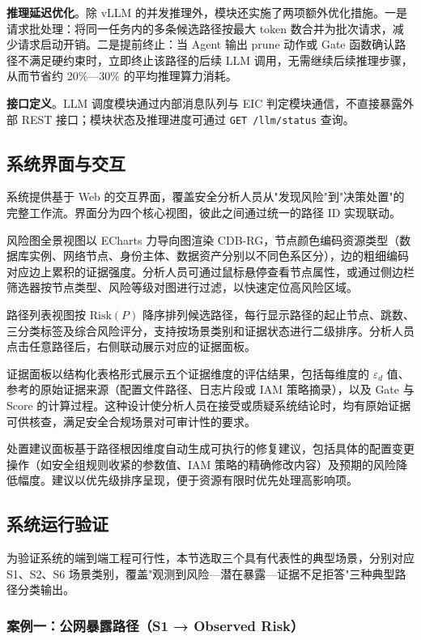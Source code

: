\documentclass[a4paper,12pt]{ctexart}
\begin{document}
\textbf{推理延迟优化}。除 vLLM 的并发推理外，模块还实施了两项额外优化措施。一是请求批处理：将同一任务内的多条候选路径按最大 token 数合并为批次请求，减少请求启动开销。二是提前终止：当 Agent 输出 prune 动作或 Gate 函数确认路径不满足硬约束时，立即终止该路径的后续 LLM 调用，无需继续后续推理步骤，从而节省约 20\%—30\% 的平均推理算力消耗。

\textbf{接口定义}。LLM 调度模块通过内部消息队列与 EIC 判定模块通信，不直接暴露外部 REST 接口；模块状态及推理进度可通过 \texttt{GET /llm/status} 查询。

\subsection{系统界面与交互}

系统提供基于 Web 的交互界面，覆盖安全分析人员从"发现风险"到"决策处置"的完整工作流。界面分为四个核心视图，彼此之间通过统一的路径 ID 实现联动。

风险图全景视图以 ECharts 力导向图渲染 CDB-RG，节点颜色编码资源类型（数据库实例、网络节点、身份主体、数据资产分别以不同色系区分），边的粗细编码对应边上累积的证据强度。分析人员可通过鼠标悬停查看节点属性，或通过侧边栏筛选器按节点类型、风险等级对图进行过滤，以快速定位高风险区域。

路径列表视图按 $\mathrm{Risk}(P)$ 降序排列候选路径，每行显示路径的起止节点、跳数、三分类标签及综合风险评分，支持按场景类别和证据状态进行二级排序。分析人员点击任意路径后，右侧联动展示对应的证据面板。

证据面板以结构化表格形式展示五个证据维度的评估结果，包括每维度的 $\varepsilon_d$ 值、参考的原始证据来源（配置文件路径、日志片段或 IAM 策略摘录），以及 Gate 与 Score 的计算过程。这种设计使分析人员在接受或质疑系统结论时，均有原始证据可供核查，满足安全合规场景对可审计性的要求。

处置建议面板基于路径根因维度自动生成可执行的修复建议，包括具体的配置变更操作（如安全组规则收紧的参数值、IAM 策略的精确修改内容）及预期的风险降低幅度。建议以优先级排序呈现，便于资源有限时优先处理高影响项。

\subsection{系统运行验证}

为验证系统的端到端工程可行性，本节选取三个具有代表性的典型场景，分别对应 S1、S2、S6 场景类别，覆盖"观测到风险—潜在暴露—证据不足拒答"三种典型路径分类输出。

\subsubsection{案例一：公网暴露路径（S1 → Observed Risk）}
\end{document}
